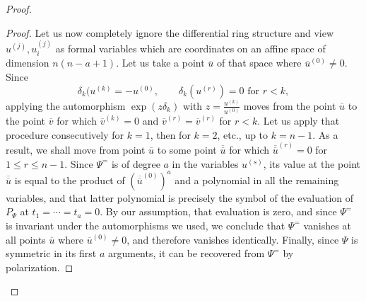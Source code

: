 \documentclass[11pt,reqno]{amsart}
\theoremstyle{plain}
\theoremstyle{definition}
\theoremstyle{remark}
\begin{document}
\begin{proof}
\begin{proof}
Let us now completely ignore the differential ring structure and view $u^{(j)}, u_i^{(j)}$ as formal variables which are coordinates on an affine space of dimension $n(n-a+1)$. Let us take a point $\overline{u}$ of that space where $\overline{u}^{(0)}\ne 0$. Since 
 \[
\delta_k(u^{(k)}=-u^{(0)}, \qquad \delta_k(u^{(r)})=0 \text{ for } r<k,  
 \]
applying the automorphism $\exp(z\delta_k)$ with $z=\frac{u^{(k)}}{u^{(0)}}$ moves from the point $\overline{u}$ to the point $\overline{v}$ for which $\overline{v}^{(k)}=0$ and $\overline{v}^{(r)}=\overline{v}^{(r)}$ for $r<k$. Let us apply that procedure consecutively for $k=1$, then for $k=2$, etc., up to $k=n-1$. As a result, we shall move from point $\overline{u}$ to some point $\overline{\overline{u}}$ for which $\overline{\overline{u}}^{(r)}=0$ for $1\le r\le n-1$. Since $\Psi^=$ is of degree $a$ in the variables $u^{(s)}$, its value at the point $\overline{\overline{u}}$ is equal to the product of $(\overline{\overline{u}}^{(0)})^a$ and a polynomial in all the remaining variables, and that latter polynomial is precisely the symbol of the evaluation of $P_\Psi$ at $t_1=\cdots=t_a=0$. By our assumption, that evaluation is zero, and since $\Psi^=$ is invariant under the automorphisms we used, we conclude that $\Psi^=$ vanishes at all points $\overline{u}$ where $\overline{u}^{(0)}\ne 0$, and therefore vanishes identically. Finally, since $\Psi$ is symmetric in its first $a$ arguments, it can be recovered from $\Psi^=$ by polarization. 
\end{proof}



\end{proof}
\end{document}
